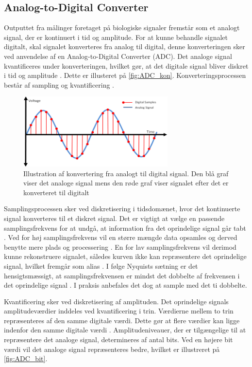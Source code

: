 \subsection{Analog-to-Digital Converter} \label{sec:ADC_teori}
Outputtet fra målinger foretaget på biologiske signaler fremstår som et analogt signal, der er kontinuert i tid og amplitude. For at kunne behandle signalet digitalt, skal signalet konverteres fra analog til digital, denne konverteringen sker ved anvendelse af en Analog-to-Digital Converter (ADC). Det analoge signal kvantificeres under konverteringen, hvilket gør, at det digitale signal bliver diskret i tid og amplitude \citep{webster1998}. Dette er illusteret på \autoref{fig:ADC_kon}. Konverteringsprocessen består af sampling og kvantificering \citep{morre2003}. 

\begin{figure}[H]
\centering
\includegraphics[width=0.7\textwidth]{figures/problemloesning/adc}
\caption{Illustration af konvertering fra analogt til digital signal. Den blå graf viser det analoge signal mens den røde graf viser signalet efter det er konverteret til digitalt}
\label{fig:ADC_kon}
\end{figure}

\noindent
Samplingsprocessen sker ved diskretisering i tidsdomænet, hvor det kontinuerte signal konverteres til et diskret signal. Det er vigtigt at vælge en passende samplingsfrekvens for at undgå, at information fra det oprindelige signal går tabt \citep{morre2003}. Ved for høj samplingsfrekvens vil en større mængde data opsamles og derved benytte mere plads og processering \citep{wolf2004}. En for lav samplingsfrekvens vil derimod kunne rekonstruere signalet, således kurven ikke kan repræsentere det oprindelige signal, hvilket fremgår som alias \citep{morre2003}. I følge Nyquists sætning er det hensigtsmæssigt, at samplingsfrekvensen er mindst det dobbelte af frekvensen i det oprindelige signal \citep{morre2003}. I praksis anbefales det dog at sample med det ti dobbelte.

Kvantificering sker ved diskretisering af amplituden. Det oprindelige signals amplitudeværdier inddeles ved kvantificering i trin. Værdierne mellem to trin repræsenteres af den samme digitale værdi. Dette gør at flere værdier kan ligge indenfor den samme digitale værdi \citep{morre2003}. Amplitudeniveauer, der er tilgængelige til at repræsentere det analoge signal, determineres af antal bits. Ved en højere bit værdi vil det analoge signal repræsenteres bedre, hvilket er illustreret på \autoref{fig:ADC_bit}.

